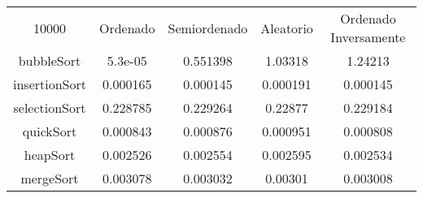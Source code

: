 \begin{longtable}{c | c | c | c | c}
10000 & Ordenado & Semiordenado & Aleatorio & Ordenado Inversamente \\
bubbleSort & 5.3e-05 & 0.551398 & 1.03318 & 1.24213 \\
insertionSort & 0.000165 & 0.000145 & 0.000191 & 0.000145 \\
selectionSort & 0.228785 & 0.229264 & 0.22877 & 0.229184 \\
quickSort & 0.000843 & 0.000876 & 0.000951 & 0.000808 \\
heapSort & 0.002526 & 0.002554 & 0.002595 & 0.002534 \\
mergeSort & 0.003078 & 0.003032 & 0.00301 & 0.003008 \\
\end{longtable}